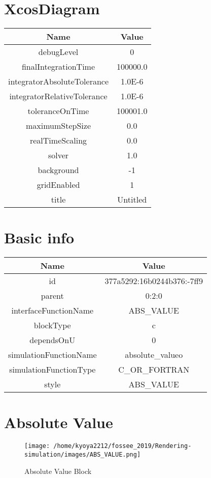 \documentclass{article}%
\begin{document}
%
\normalsize%
\section{XcosDiagram}%
\label{sec:XcosDiagram}%
\begin{tabular}{|c|c|}%
\hline%
Name&Value\\%
\hline%
debugLevel&0\\%
\hline%
finalIntegrationTime&100000.0\\%
\hline%
integratorAbsoluteTolerance&1.0E{-}6\\%
\hline%
integratorRelativeTolerance&1.0E{-}6\\%
\hline%
toleranceOnTime&100001.0\\%
\hline%
maximumStepSize&0.0\\%
\hline%
realTimeScaling&0.0\\%
\hline%
solver&1.0\\%
\hline%
background&{-}1\\%
\hline%
gridEnabled&1\\%
\hline%
title&Untitled\\%
\hline%
\end{tabular}

%
\section{Basic info}%
\label{sec:Basic info}%
\begin{tabular}{|c|c|}%
\hline%
Name&Value\\%
\hline%
id&377a5292:16b0244b376:{-}7ff9\\%
\hline%
parent&0:2:0\\%
\hline%
interfaceFunctionName&ABS\_VALUE\\%
\hline%
blockType&c\\%
\hline%
dependsOnU&0\\%
\hline%
simulationFunctionName&absolute\_valueo\\%
\hline%
simulationFunctionType&C\_OR\_FORTRAN\\%
\hline%
style&ABS\_VALUE\\%
\hline%
\end{tabular}

%
\section{Absolute Value}%
\label{sec:Absolute Value}%


\begin{figure}[h!]%
\centering%
\texttt{[image: /home/kyoya2212/fossee\_2019/Rendering-simulation/images/ABS\_VALUE.png]}%
\caption{Absolute Value Block}%
\end{figure}

%
\end{document}
